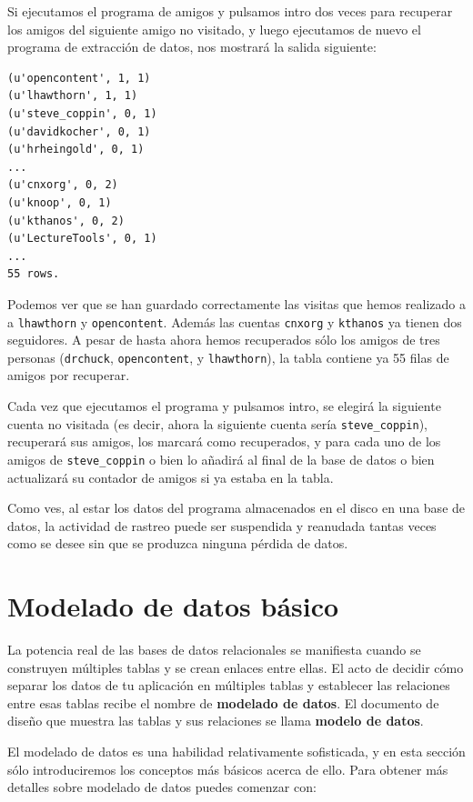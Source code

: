 Si ejecutamos el programa de amigos y pulsamos intro dos veces para recuperar
los amigos del siguiente amigo no visitado,
y luego ejecutamos de nuevo el programa de extracción de datos, nos mostrará la
salida siguiente: 

\beforeverb
\begin{verbatim}
(u'opencontent', 1, 1)
(u'lhawthorn', 1, 1)
(u'steve_coppin', 0, 1)
(u'davidkocher', 0, 1)
(u'hrheingold', 0, 1)
...
(u'cnxorg', 0, 2)
(u'knoop', 0, 1)
(u'kthanos', 0, 2)
(u'LectureTools', 0, 1)
...
55 rows.
\end{verbatim}
\afterverb
%
Podemos ver que se han guardado correctamente las visitas que hemos realizado a
a {\tt lhawthorn} y {\tt opencontent}. Además las cuentas
{\tt cnxorg} y {\tt kthanos} ya tienen dos seguidores.
A pesar de hasta ahora hemos recuperados sólo los amigos de tres personas
({\tt drchuck}, {\tt opencontent}, y {\tt lhawthorn}), la tabla contiene ya
55 filas de amigos por recuperar.

Cada vez que ejecutamos el programa y pulsamos intro, se elegirá la siguiente
cuenta no visitada (es decir, ahora la siguiente cuenta sería \verb"steve_coppin"),
recuperará sus amigos, los marcará como recuperados, y para cada uno de los
amigos de \verb"steve_coppin" o bien lo añadirá al final de la
base de datos o bien actualizará su contador de amigos si ya estaba en la
tabla.

Como ves, al estar los datos del programa almacenados en el disco en una base de datos,
la actividad de rastreo puede ser suspendida y reanudada tantas veces como se desee
sin que se produzca ninguna pérdida de datos.

\section{Modelado de datos básico}

La potencia real de las bases de datos relacionales se manifiesta cuando se construyen múltiples
tablas y se crean enlaces entre ellas. El acto de decidir cómo separar los datos de tu
aplicación en múltiples tablas y establecer las relaciones
entre esas tablas recibe el nombre de {\bf modelado de datos}. El
documento de diseño que muestra las tablas y sus relaciones
se llama {\bf modelo de datos}.

El modelado de datos es una habilidad relativamente sofisticada, y en esta sección sólo
introduciremos los conceptos más básicos acerca de ello. Para obtener más
detalles sobre modelado de datos puedes comenzar con:

